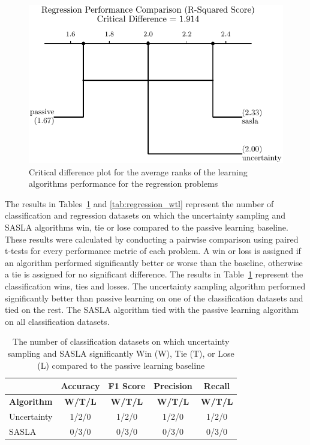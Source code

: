 \documentclass[conference]{IEEEtran}
\begin{document}
	\begin{figure}[htbp]
		\centering
		\includegraphics[width=\linewidth]{plots/regression_critical_difference.pdf}
		\caption{Critical difference plot for the average ranks of the learning algorithms performance for the regression problems}
		\label{fig:regression_cd}
	\end{figure}
	
	The results in Tables~\ref{tab:classification_wtl} and \ref{tab:regression_wtl} represent the number of classification and regression datasets on which the uncertainty sampling and SASLA algorithms win, tie or lose compared to the passive learning baseline. These results were calculated by conducting a pairwise comparison using paired t-tests for every performance metric of each problem. A win or loss is assigned if an algorithm performed significantly better or worse than the baseline, otherwise a tie is assigned for no significant difference. The results in Table~\ref{tab:classification_wtl} represent the classification wins, ties and losses. The uncertainty sampling algorithm performed significantly better than passive learning on one of the classification datasets and tied on the rest. The SASLA algorithm tied with the passive learning algorithm on all classification datasets.
	
	\begin{table}[htbp]
		\centering
		\caption{The number of classification datasets on which uncertainty sampling and SASLA significantly Win (W), Tie (T), or Lose (L) compared to the passive learning baseline}
		\label{tab:classification_wtl}
		\begin{tabular}{lcccc}
			\hline
			& \textbf{Accuracy} & \textbf{F1 Score} & \textbf{Precision} & \textbf{Recall} \\
			\hline
			\textbf{Algorithm} & \textbf{W/T/L} & \textbf{W/T/L} &\textbf{W/T/L} & \textbf{W/T/L} \\
			\hline
			Uncertainty & 1/2/0 & 1/2/0 & 1/2/0 & 1/2/0 \\
			SASLA       & 0/3/0 & 0/3/0 & 0/3/0 & 0/3/0 \\
			\hline
		\end{tabular}
	\end{table}
	
\end{document}
